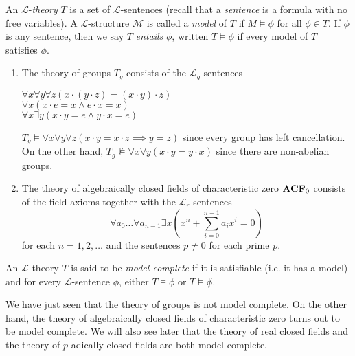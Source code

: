 \begin{definition}
An $\mathcal{L}$-\emph{theory} $T$ is a set of $\mathcal{L}$-sentences (recall that a \emph{sentence} is a formula with no free variables). A $\mathcal{L}$-structure $\mathcal{M}$ is called a \emph{model} of $T$ if $M\models \phi$ for all $\phi\in T$. If $\phi$ is any sentence, then we say $T$ \emph{entails} $\phi$, written $T\models \phi$ if every model of $T$ satisfies $\phi$.
\end{definition}

\begin{example}
	\begin{enumerate}
		\item The theory of groups $T_g$ consists of the $\mathcal{L}_g$-sentences\vspace{-.2cm}
			\begin{center}
			$\forall x\forall y\forall z (x\cdot(y\cdot z) = (x\cdot y)\cdot z)$\\
			$\forall x (x\cdot e = x\wedge e\cdot x = x)$\\
			$\forall x \exists y (x\cdot y = e\wedge y\cdot x = e)$
			\end{center}
$T_g\models \forall x\forall y\forall z (x\cdot y = x\cdot z\implies y=z)$ since every group has left cancellation. On the other hand, $T_g\not\models \forall x\forall y (x\cdot y = y\cdot x)$ since there are non-abelian groups.
		\item The theory of algebraically closed fields of characteristic zero ${\normalfont\textbf{ACF}}_0$ consists of the field axioms together with the $\mathcal{L}_r$-sentences $$\forall a_0\dots \forall a_{n-1}\exists x (x^n + \sum_{i=0}^{n-1}a_i x^i=0)$$ for each $n=1,2,\dots$ and the sentences $p\neq 0$ for each prime $p$.
	\end{enumerate}
\end{example}

\begin{definition}
An $\mathcal{L}$-theory $T$ is said to be \emph{model complete} if it is satisfiable (i.e. it has a model) and for every $\mathcal{L}$-sentence $\phi$, either $T\models \phi$ or $T\models \not\phi$. 
\end{definition}

We have just seen that the theory of groups is not model complete. On the other hand, the theory of algebraically closed fields of characteristic zero turns out to be model complete. We will also see later that the theory of real closed fields and the theory of $p$-adically closed fields are both model complete.


